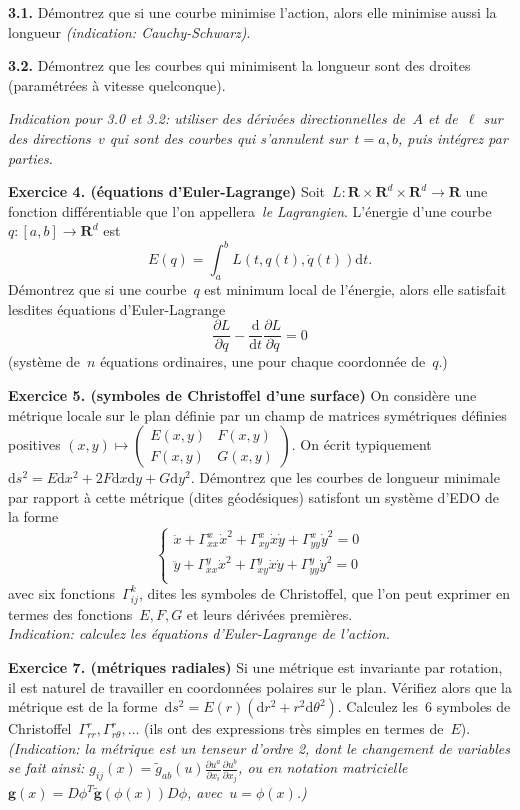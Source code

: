 \documentclass[a4paper,11pt]{article}
\def\ud{\mathrm{d}}
\def\R{\mathbf{R}}
\begin{document}
{\bf 3.1.} Démontrez que si une courbe minimise l'action, alors elle minimise
aussi la longueur {\sl (indication: Cauchy-Schwarz)}.

{\bf 3.2.} Démontrez que les courbes qui minimisent la longueur sont des
droites (paramétrées à vitesse quelconque).

{\sl
Indication pour 3.0 et 3.2: utiliser des dérivées directionnelles de~$A$ et
de~$\ell$ sur des directions~$v$ qui sont des courbes qui s'annulent
sur~$t=a,b$, puis intégrez par parties.
}

{\bf Exercice 4. (équations d'Euler-Lagrange)}
Soit~$L:\R\times\R^d\times\R^d\to\R$ une fonction différentiable que l'on
appellera~\emph{le Lagrangien}.  L'énergie d'une courbe~$q:[a,b]\to\R^d$ est
\[
	E(q)=\int_a^b L\left(t,q(t),\dot q(t)\right)\ud t.
\]
Démontrez que si une courbe~$q$ est minimum local de l'énergie, alors elle
satisfait lesdites équations d'Euler-Lagrange
\[
	\frac{\partial L}{\partial q}-\frac{\ud}{\ud t}\frac{\partial
	L}{\partial\dot q} = 0
\]
(système de~$n$ équations ordinaires, une pour chaque coordonnée
de~$q$.)


{\bf Exercice 5. (symboles de Christoffel d'une surface)}
On considère une métrique locale sur le plan définie par un champ de matrices
symétriques définies positives
$(x,y)\mapsto\left(\begin{matrix}E(x,y)&F(x,y)\\F(x,y)&G(x,y)\end{matrix}\right)$.
On écrit typiquement~$\ud s^2=E\ud x^2 + 2F\ud x\ud y+G\ud y^2$.
Démontrez que les courbes de longueur minimale par rapport à cette métrique
(dites géodésiques) satisfont un système d'EDO de la forme
\[
\begin{cases}
\ddot x+\Gamma^x_{xx}\dot x^2+\Gamma^x_{xy}\dot x\dot y+\Gamma^x_{yy}\dot y^2=0\\
\ddot y+\Gamma^y_{xx}\dot x^2+\Gamma^y_{xy}\dot x\dot y+\Gamma^y_{yy}\dot y^2=0\\
\end{cases}
\]
avec six fonctions~$\Gamma^k_{ij}$, dites les symboles de Christoffel, que l'on
peut exprimer en termes des fonctions~$E,F,G$ et leurs dérivées premières.\\
{\sl Indication: calculez les équations d'Euler-Lagrange de l'action.}

{\bf Exercice 7. (métriques radiales)}
Si une métrique est invariante par rotation,
il est naturel de travailler en
coordonnées polaires sur le plan.  Vérifiez alors que la métrique est de la
forme~$\ud s^2=E(r)\left(\ud r^2+r^2\ud\theta^2\right)$.  Calculez les~$6$ symboles de
Christoffel~$\Gamma^r_{rr},\Gamma^r_{r\theta},\ldots$ (ils ont des expressions
très simples en termes de~$E$).
{\sl(Indication: la métrique est un tenseur d'ordre 2, dont le changement de
variables se fait ainsi:
$g_{ij}(x)=\tilde{g}_{ab}(u) \frac{\partial u^a}{\partial x_i} \frac{\partial
u^b}{\partial x_j}$, ou en notation
matricielle~$\mathbf{g}(x)=D\phi^T\tilde{\mathbf{g}}\left(\phi(x)\right)D\phi$,
avec~$u=\phi(x)$.)}
\end{document}
